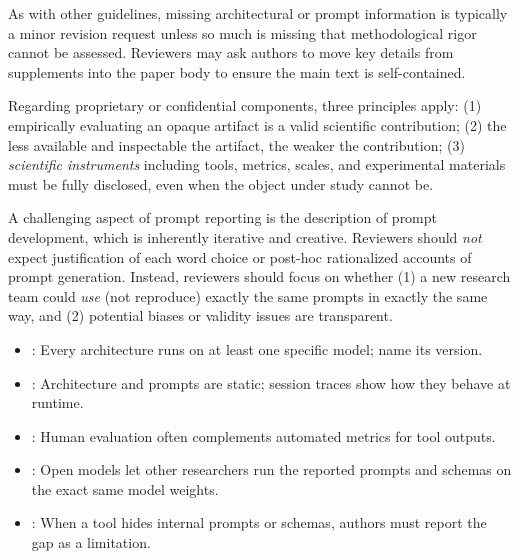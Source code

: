 
As with other guidelines, missing architectural or prompt information is typically a minor revision request unless so much is missing that methodological rigor cannot be assessed. Reviewers may ask authors to move key details from supplements into the paper body to ensure the main text is self-contained.

Regarding proprietary or confidential components, three principles apply: (1) empirically evaluating an opaque artifact is a valid scientific contribution; (2) the less available and inspectable the artifact, the weaker the contribution; (3) \textit{scientific instruments} including tools, metrics, scales, and experimental materials must be fully disclosed, even when the object under study cannot be.

A challenging aspect of prompt reporting is the description of prompt development, which is inherently iterative and creative. Reviewers should \textit{not} expect justification of each word choice or post-hoc rationalized accounts of prompt generation. Instead, reviewers should focus on whether (1) a new research team could \textit{use} (not reproduce) exactly the same prompts in exactly the same way, and (2) potential biases or validity issues are transparent.

\begin{itemize}[label=$\rightarrow$]
    \item \seemodelversion: Every architecture runs on at least one specific model; name its version.
    \item \seetraces: Architecture and prompts are static; session traces show how they behave at runtime.
    \item \seehumanvalidation: Human evaluation often complements automated metrics for tool outputs.
    \item \seeopenllm: Open models let other researchers run the reported prompts and schemas on the exact same model weights.
    \item \seelimitationsmitigations: When a tool hides internal prompts or schemas, authors must report the gap as a limitation.
\end{itemize}
